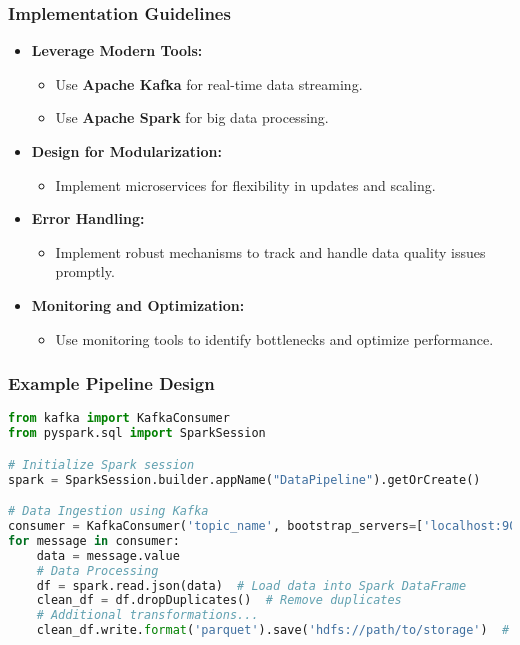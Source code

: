 \documentclass{beamer}
\begin{document}
\begin{frame}[fragile]
    \frametitle{Implementation Guidelines}
    \begin{itemize}
        \item \textbf{Leverage Modern Tools:}
            \begin{itemize}
                \item Use \textbf{Apache Kafka} for real-time data streaming.
                \item Use \textbf{Apache Spark} for big data processing.
            \end{itemize}
        
        \item \textbf{Design for Modularization:}
            \begin{itemize}
                \item Implement microservices for flexibility in updates and scaling.
            \end{itemize}

        \item \textbf{Error Handling:}
            \begin{itemize}
                \item Implement robust mechanisms to track and handle data quality issues promptly.
            \end{itemize}

        \item \textbf{Monitoring and Optimization:}
            \begin{itemize}
                \item Use monitoring tools to identify bottlenecks and optimize performance.
            \end{itemize}
    \end{itemize}
\end{frame}

\begin{frame}[fragile]
    \frametitle{Example Pipeline Design}
    \begin{lstlisting}[language=Python]
from kafka import KafkaConsumer
from pyspark.sql import SparkSession

# Initialize Spark session
spark = SparkSession.builder.appName("DataPipeline").getOrCreate()

# Data Ingestion using Kafka
consumer = KafkaConsumer('topic_name', bootstrap_servers=['localhost:9092'])
for message in consumer:
    data = message.value
    # Data Processing
    df = spark.read.json(data)  # Load data into Spark DataFrame
    clean_df = df.dropDuplicates()  # Remove duplicates
    # Additional transformations...
    clean_df.write.format('parquet').save('hdfs://path/to/storage')  # Data Storage
    \end{lstlisting}
\end{frame}
\end{document}
